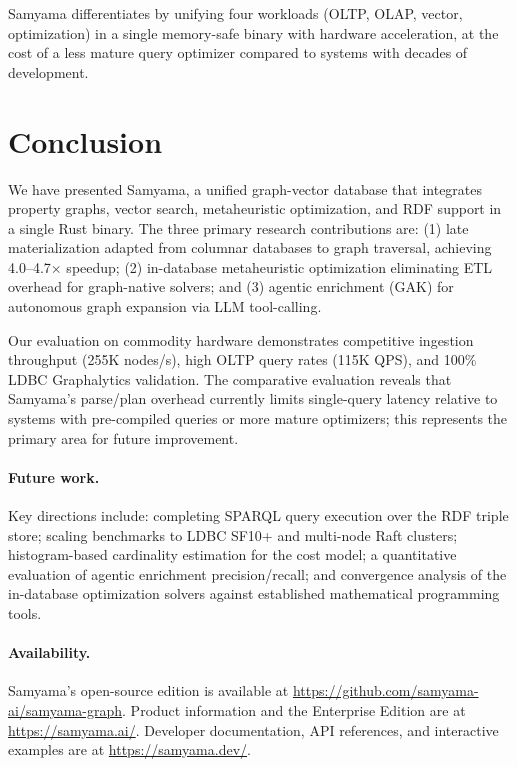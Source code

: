 \documentclass[11pt]{article}
\begin{document}
Samyama differentiates by unifying four workloads (OLTP, OLAP, vector, optimization) in a single memory-safe binary with hardware acceleration, at the cost of a less mature query optimizer compared to systems with decades of development.

\section{Conclusion}

We have presented Samyama, a unified graph-vector database that integrates property graphs, vector search, metaheuristic optimization, and RDF support in a single Rust binary. The three primary research contributions are: (1) late materialization adapted from columnar databases to graph traversal, achieving 4.0--4.7$\times$ speedup; (2) in-database metaheuristic optimization eliminating ETL overhead for graph-native solvers; and (3) agentic enrichment (GAK) for autonomous graph expansion via LLM tool-calling.

Our evaluation on commodity hardware demonstrates competitive ingestion throughput (255K nodes/s), high OLTP query rates (115K QPS), and 100\% LDBC Graphalytics validation. The comparative evaluation reveals that Samyama's parse/plan overhead currently limits single-query latency relative to systems with pre-compiled queries or more mature optimizers; this represents the primary area for future improvement.

\paragraph{Future work.} Key directions include: completing SPARQL query execution over the RDF triple store; scaling benchmarks to LDBC SF10+ and multi-node Raft clusters; histogram-based cardinality estimation for the cost model; a quantitative evaluation of agentic enrichment precision/recall; and convergence analysis of the in-database optimization solvers against established mathematical programming tools.

\paragraph{Availability.} Samyama's open-source edition is available at \url{https://github.com/samyama-ai/samyama-graph}. Product information and the Enterprise Edition are at \url{https://samyama.ai/}. Developer documentation, API references, and interactive examples are at \url{https://samyama.dev/}.



\end{document}
